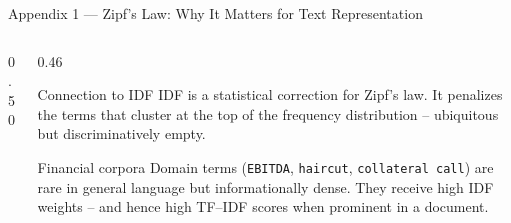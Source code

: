 \documentclass[aspectratio=169]{beamer}
\begin{document}
\begin{frame}{Appendix 1 --- Zipf's Law: Why It Matters for Text Representation}
\begin{columns}[T]
\begin{column}{0.50\textwidth}
\end{column}
\begin{column}{0.46\textwidth}
\begin{block}{Connection to IDF}
IDF is a statistical correction for Zipf's law. It penalizes the terms that cluster
at the top of the frequency distribution -- ubiquitous but discriminatively empty.
\end{block}
 
\begin{block}{Financial corpora}
Domain terms (\texttt{EBITDA}, \texttt{haircut}, \texttt{collateral call}) are rare
in general language but informationally dense. They receive high IDF weights -- and
hence high TF--IDF scores when prominent in a document.
\end{block}

\end{column}
\end{columns}
\end{frame}
%
%
\end{document}
